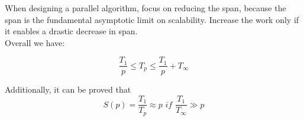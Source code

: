 When designing a parallel algorithm, focus on reducing the span, because the span is the fundamental asymptotic limit on scalability. Increase the work only if it enables a drastic decrease in span.\\
Overall we have:

\begin{equation}
   \frac{T_1}{p} \leq T_p \leq \frac{T_1}{p} + T_{\infty}
\end{equation}

Additionally, it can be proved that
\begin{equation}
   S(p) = \frac{T_1}{T_p} \approx p \textit{ if } \frac{T_1}{T_{\infty}} \gg p
\end{equation}